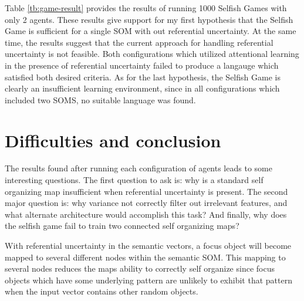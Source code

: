 \documentclass[a4paper,11pt]{article}
\begin{document}
Table \ref{tb:game-result} provides the results of running 1000 Selfish Games
with only 2 agents.  These results give support for my first hypothesis that the
Selfish Game is sufficient for a single SOM with out referential uncertainty.  At
the same time, the results suggest that the current approach for handling
referential uncertainty is not feasible.  Both configurations which utilized
attentional learning in the presence of referential uncertainty failed to
produce a langauge which satisfied both desired criteria.  As for the last
hypothesis, the Selfish Game is clearly an insufficient learning environment,
since in all configurations which included two SOMS, no suitable language was
found.

\section{Difficulties and conclusion}
The results found after running each configuration of agents leads to some
interesting questions.  The first question to ask is: why is a standard self
organizing map insufficient when referential uncertainty is present.  The second
major question is: why variance not correctly filter out irrelevant features,
and what alternate architecture would accomplish this task?  And finally, why
does the selfish game fail to train two connected self organizing maps?  

With referential uncertainty in the semantic vectors, a focus object will become
mapped to several different nodes within the semantic SOM.  This mapping to
several nodes reduces the maps ability to correctly self organize since focus
objects which have some underlying pattern are unlikely to exhibit that pattern
when the input vector contains other random objects.


\end{document}
